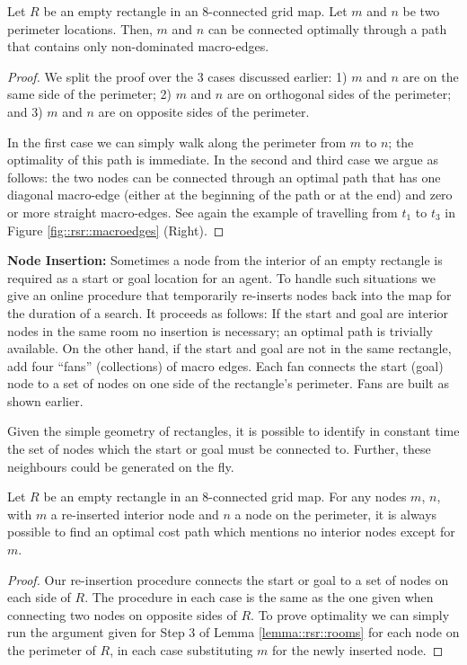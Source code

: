 \begin{lemma} \label{lemma::rsr::rooms} Let $R$ be an empty rectangle in
an 8-connected grid map. Let $m$ and $n$ be two perimeter locations.
Then, $m$ and $n$ can be connected optimally through a path that
contains only non-dominated macro-edges.
\end{lemma}

\begin{proof}
We split the proof over the 3 cases discussed earlier: 1) {$m$ and $n$ are on
the same side of the perimeter;} 2) {\label{lemma::rsr::rooms-step2}$m$ and
$n$ are on orthogonal sides of the perimeter;} and 3)
{\label{lemma::rsr::rooms-step3} $m$ and $n$ are on opposite sides of the
perimeter.}

In the first case we can simply walk along the perimeter from $m$ to $n$; the
optimality of this path is immediate. In the second and third case we argue as
follows: the two nodes can be connected through an optimal path that has one
diagonal macro-edge (either at the beginning of the path or at the end) and
zero or more straight macro-edges.  See again the example of travelling from
$t_1$ to $t_3$ in Figure
\ref{fig::rsr::macroedges} (Right).
\end{proof}

\noindent
\textbf{Node Insertion:}
Sometimes a node from the interior of an empty rectangle is required as a start
or goal location for an agent.  To handle such situations we give an online
procedure that temporarily re-inserts nodes back into the map for the duration
of a search.  It proceeds as follows: {If the start and goal are interior nodes
in the same room no insertion is necessary; an optimal path is trivially
available. } {On the other hand, if the start and goal are not in the same
rectangle, add four ``fans'' (collections) of macro edges.  Each fan connects
the start (goal) node to a set of nodes on one side of the rectangle's
perimeter.  Fans are built as shown earlier.}

Given the simple geometry of rectangles, it is possible to identify in constant
time the set of nodes which the start or goal must be connected to.  Further,
these neighbours could be generated on the fly.

\begin{lemma}
\label{lemma::rsr::insertion}
Let $R$ be an empty rectangle in an 8-connected grid map.  For any
nodes $m$, $n$, with $m$ a re-inserted interior node and $n$ a node on the
perimeter, it is always possible to find an optimal cost path which mentions
no interior nodes except for $m$.
\end{lemma}
\begin{proof}
Our re-insertion procedure connects the start or goal to a set of nodes on each
side of $R$.  The procedure in each case is the same as the one given when
connecting two nodes on opposite sides of $R$.  To prove optimality we can
simply run the argument given for Step 3 of Lemma \ref{lemma::rsr::rooms} for each
node on the perimeter of $R$, in each case substituting $m$ for the newly
inserted node.
\end{proof}

